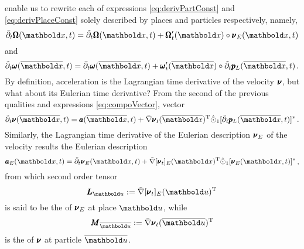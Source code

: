 enable us to rewrite each of expressions \eqref{eq:derivPartConst} and \eqref{eq:derivPlaceConst} solely described by places and particles respectively, namely,   
\begin{equation}
\bar{\partial}_t\tnr{\Omega}({\vto{x}},t)=\tilde{\partial}_t\tnr{\Omega}({\vto{x}},t)+\tnr{\Omega}_t'(\vto{x})\circ\tnr{\nu}_E(\vto{x},t)
\end{equation}
and
\begin{equation}
\tilde{\partial}_t\tnr{\omega}(\overline{\vto{x}},t)=\bar{\partial}_t\tnr{\omega}(\overline{\vto{x}},t)+\tnr{\omega}_t'(\overline{\vto{x}})\circ\tilde{\partial}_t \tnr{p}_L(\overline{\vto{x}},t)\,.
\end{equation}
By definition, acceleration is the Lagrangian time derivative of the velocity $\pmb{\nu}$, but what about its Eulerian time derivative? From the second of the previous qualities and expressions \eqref{eq:compoVector}, vector 
\begin{equation}
\tilde{\partial}_t\tnr{\nu}(\overline{\vto{x}},t)=\tnr{a}(\overline{\vto{x}},t)+\fua{\bar{\nabla}\tnr{\nu}_t}{\overline{\vto{x}}}^{\text{T}}\hat{\odot}_1[\tilde{\partial}_t \tnr{p}_L(\overline{\vto{x}},t)]^*\,.
\end{equation}
Similarly, the Lagrangian time derivative of the Eulerian description $\pmb{\nu}_E$ of the velocity results the Eulerian description  
\begin{equation}
\tnr{a}_E(\vto{x},t)=\tilde{\partial}_t\tnr{\nu}_E({\vto{x}},t)+\fua{\tilde{\nabla}[\tnr{\nu}_t]_E}{{\vto{x}}}^{\text{T}}\hat{\odot}_1[{\tnr{\nu}_E}(\vto{x},t)]^*\,,
\end{equation}
from which second order tensor 
 \begin{equation}\label{eq:eulerVelocityGrad}
 \tnr{L}_{\vto{u}}:=\fua{\tilde{\nabla}[\tnr{\nu}_t]_E}{{\vto{u}}}^{\text{T}}
 \end{equation}
is said to be the  of $\pmb{\nu}_E$ at place $\vto{u}$, while
 \begin{equation}\label{eq:lagrangVelocityGrad}
 \tnr{M}_{\overline{\vto{u}}}:=\fua{\bar{\nabla}\tnr{\nu}_t}{\overline{\vto{u}}}^{\text{T}}
 \end{equation}
is the  of $\pmb{\nu}$ at particle $\overline{\vto{u}}$. 

